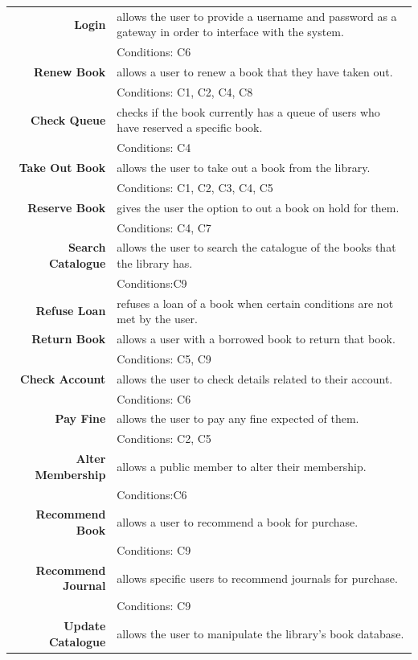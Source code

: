 \begingroup
\def\arraystretch{1.5}
\begin{longtabu}{>{\bfseries}r X}
    Login & allows the user to provide a username and password as a gateway in order to interface with the system. \\ & Conditions: C6 \\
    Renew Book & allows a user to renew a book that they have taken out. \\ & Conditions: C1, C2, C4, C8 \\
    Check Queue & checks if the book currently has a queue of users who have reserved a specific book.  \\ & Conditions: C4 \\
    Take Out Book & allows the user to take out a book from the library. \\ & Conditions: C1, C2, C3, C4, C5 \\
    Reserve Book & gives the user the option to out a book on hold for them. \\ & Conditions: C4, C7 \\
    Search Catalogue & allows the user to search the catalogue of the books that the library has. \\ & Conditions:C9 \\
    Refuse Loan & refuses a loan of a book when certain conditions are not met by the user. \\
    Return Book & allows a user with a borrowed book to return that book. \\ & Conditions: C5, C9 \\
    Check Account & allows the user to check details related to their account. \\ & Conditions: C6 \\
    Pay Fine & allows the user to pay any fine expected of them. \\ & Conditions: C2, C5 \\
    Alter Membership & allows a public member to alter their membership. \\ & Conditions:C6 \\
    Recommend Book & allows a user to recommend a book for purchase. \\ & Conditions: C9 \\
    Recommend Journal & allows specific users to recommend journals for purchase. \\ & Conditions: C9 \\
    Update Catalogue & allows the user to manipulate the library’s book database. \\

\end{longtabu}
